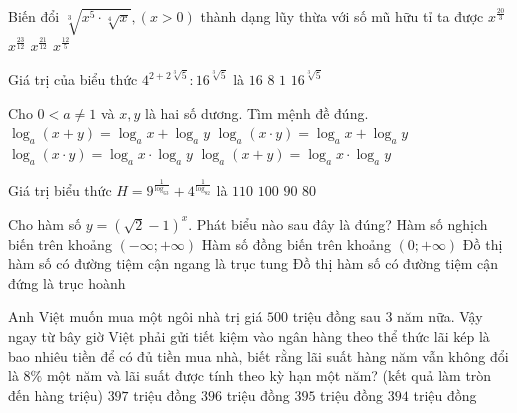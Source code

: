 \begin{ex}%
	Biến đổi $\sqrt[3]{x^5\cdot\sqrt[4]{x}}, \left(x>0\right)$ thành dạng lũy thừa với số mũ hữu tỉ ta được
	\choice
	{${x}^{\tfrac{20}{3}}$}
	{${x}^{\tfrac{23}{12}}$}
	{\True ${x}^{\tfrac{21}{12}}$}
	{${x}^{\tfrac{12}{5}}$}
\end{ex}
\begin{ex}%
	Giá trị của biểu thức ${4}^{2+2\sqrt[3]{5}}:{16}^{\sqrt[3]{5}}$ là
	\choice
	{\True $16$}
	{$8$}
	{$1$}
	{${16}^{\sqrt[3]{5}}$}
\end{ex}
\begin{ex}%
	Cho $0<a\ne 1$ và $x, y$ là hai số dương. Tìm mệnh đề đúng.
	\choice
	{$\log_a(x+y)=\log_ax+\log_ay$}
	{\True $\log_a(x\cdot y)=\log_ax+\log_ay$}
	{$\log_a(x\cdot y)=\log_ax\cdot\log_ay$}
	{$\log_a(x+y)=\log_ax\cdot\log_ay$}
\end{ex}
\begin{ex}%
	Giá trị biểu thức $H={9}^{\tfrac{1}{\log_63}}+{4}^{\tfrac{1}{\log_82}}$ là
	\choice
	{$110$}
	{\True $100$}
	{$90$}
	{$80$}
\end{ex}
\begin{ex}%
	Cho hàm số $y={\left(\sqrt{2}-1\right)}^x$. Phát biểu nào sau đây là đúng?
	\choice
	{\True Hàm số nghịch biến trên khoảng $(-\infty;+\infty)$}
	{Hàm số đồng biến trên khoảng $(0;+\infty)$}
	{Đồ thị hàm số có đường tiệm cận ngang là trục tung}
	{Đồ thị hàm số có đường tiệm cận đứng là trục hoành}
\end{ex}
\begin{ex}%
	Anh Việt muốn mua một ngôi nhà trị giá $500$ triệu đồng sau $3$ năm nữa. Vậy ngay từ bây giờ Việt phải gửi tiết kiệm vào ngân hàng theo thể thức lãi kép là bao nhiêu tiền để có đủ tiền mua nhà, biết rằng lãi suất hàng năm vẫn không đổi là $8\%$ một năm và lãi suất được tính theo kỳ hạn một năm? (kết quả làm tròn đến hàng triệu)
	\choice
	{\True $397$ triệu đồng}
	{$396$ triệu đồng}
	{$395$ triệu đồng}
	{$394$ triệu đồng}
\end{ex}
